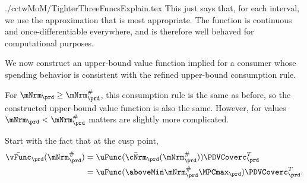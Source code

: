 \documentclass[\econtexRoot/SolvingMicroDSOPs]{subfiles}
\begin{document}
\begin{verbatimwrite}{./cctwMoM/TighterThreeFuncsExplain.tex}
  This just says that, for each interval, we use the approximation that
  is most appropriate.  The function is continuous and
  once-differentiable everywhere, and is therefore well behaved for
  computational purposes.
  \begin{comment}
    In practice, in our problem the difference due to this refinement is displayed in Figure \ref{fig:IntExpFOCInvPesReaOpt45GapPlot}.
    \hypertarget{IntExpFOCInvPesReaOpt45GapPlot}{}
    \begin{figure}
      \texttt{[image: ./Figures/IntExpFOCInvPesReaOpt45GapPlot]}
      \caption{Difference Between $\Aprx{\Hi{\cFunc}}_{L, T-1}$ and $\Aprx{\Hi{\cFunc}}_{H,T-1}$ is Small}
      \label{fig:IntExpFOCInvPesReaOpt45GapPlot}
    \end{figure}
  \end{comment}

  We now construct an upper-bound value function implied for a consumer whose spending behavior is consistent with the refined upper-bound consumption rule.

  For $\mNrm_{\prd} \geq \mNrm_{\prd}^{\#}$, this consumption rule is the same as before,
  so the constructed upper-bound value function is also the same.  However, for
  values $\mNrm_{\prd} < \mNrm_{\prd}^{\#}$ matters are slightly more complicated.

  Start with the fact that at the cusp point,
  \begin{equation*}\begin{gathered}\begin{aligned}
        \bar{\vFunc}_{\prd}(\mtCusp)  & = \uFunc(\bar{\cNrm}_{\prd}(\mtCusp))\PDVCoverc_{\prd}^{T} \\
        & =  \uFunc(\aboveMin \mtCusp  \MPCmax_{\prd})\PDVCoverc_{\prd}^{T}
        .
      \end{aligned}\end{gathered}\end{equation*}


\end{verbatimwrite}
\end{document}
